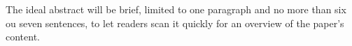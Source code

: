 The ideal abstract will be brief, limited to one paragraph and no more than six ou seven sentences, to let readers scan it quickly for an overview of the paper's content.